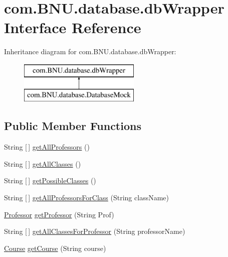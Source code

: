 \hypertarget{interfacecom_1_1_b_n_u_1_1database_1_1db_wrapper}{}\section{com.\+B\+N\+U.\+database.\+db\+Wrapper Interface Reference}
\label{interfacecom_1_1_b_n_u_1_1database_1_1db_wrapper}
Inheritance diagram for com.\+B\+N\+U.\+database.\+db\+Wrapper\+:\begin{figure}[H]
\begin{center}
\leavevmode
\includegraphics[height=2.000000cm]{interfacecom_1_1_b_n_u_1_1database_1_1db_wrapper}
\end{center}
\end{figure}
\subsection*{Public Member Functions}
\begin{DoxyCompactItemize}
\item 
String \mbox{[}$\,$\mbox{]} \mbox{\hyperlink{interfacecom_1_1_b_n_u_1_1database_1_1db_wrapper_a96dc3be93fc9c8a6e27451d35780fda9}{get\+All\+Professors}} ()
\item 
String \mbox{[}$\,$\mbox{]} \mbox{\hyperlink{interfacecom_1_1_b_n_u_1_1database_1_1db_wrapper_a00d5713c600293c5a0e84e83ae639e9a}{get\+All\+Classes}} ()
\item 
String \mbox{[}$\,$\mbox{]} \mbox{\hyperlink{interfacecom_1_1_b_n_u_1_1database_1_1db_wrapper_a1ed594ea1c8144cbcdab0e5a6a446722}{get\+Possible\+Classes}} ()
\item 
String \mbox{[}$\,$\mbox{]} \mbox{\hyperlink{interfacecom_1_1_b_n_u_1_1database_1_1db_wrapper_a86e057ce56cf8e7c75ee79bfc8bfcd21}{get\+All\+Professors\+For\+Class}} (String class\+Name)
\item 
\mbox{\hyperlink{classcom_1_1_b_n_u_1_1pages_1_1teachers_by_class_1_1_professor}{Professor}} \mbox{\hyperlink{interfacecom_1_1_b_n_u_1_1database_1_1db_wrapper_a59b21a9c8d9f8ad2c2d723bfca5952af}{get\+Professor}} (String Prof)
\item 
String \mbox{[}$\,$\mbox{]} \mbox{\hyperlink{interfacecom_1_1_b_n_u_1_1database_1_1db_wrapper_a552a89b5ef9a8a824f922a4098569dcb}{get\+All\+Classes\+For\+Professor}} (String professor\+Name)
\item 
\mbox{\hyperlink{classcom_1_1_b_n_u_1_1pages_1_1classes_by_teacher_1_1_course}{Course}} \mbox{\hyperlink{interfacecom_1_1_b_n_u_1_1database_1_1db_wrapper_a1dda3f09c5d0381e824cf71276e67447}{get\+Course}} (String course)
\end{DoxyCompactItemize}


